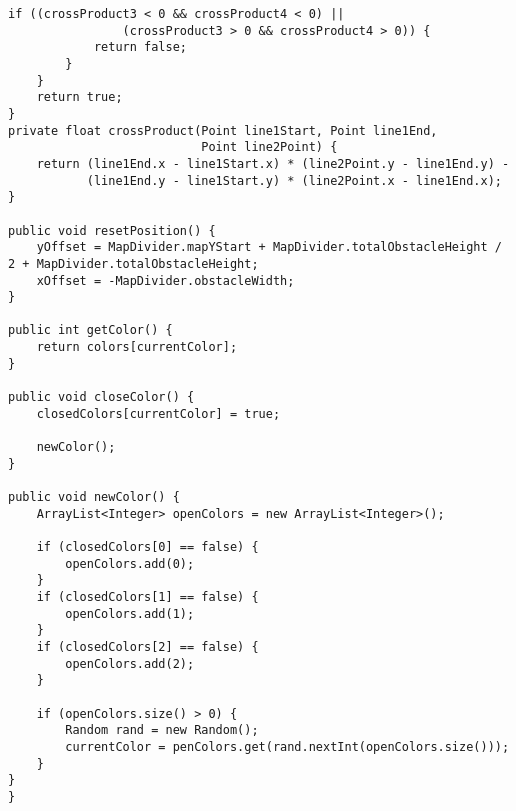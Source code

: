 \begin{lstlisting}[style=csharp,label=car_class, caption={Run method from the original Cars project.}]
		if ((crossProduct3 < 0 && crossProduct4 < 0) ||
				(crossProduct3 > 0 && crossProduct4 > 0)) {
			return false;
		}
	}		
	return true;
}
private float crossProduct(Point line1Start, Point line1End,
						   Point line2Point) {
	return (line1End.x - line1Start.x) * (line2Point.y - line1End.y) -
		   (line1End.y - line1Start.y) * (line2Point.x - line1End.x);
}
	
public void resetPosition() {
	yOffset = MapDivider.mapYStart + MapDivider.totalObstacleHeight / 2 + MapDivider.totalObstacleHeight;
	xOffset = -MapDivider.obstacleWidth;
}
	
public int getColor() {
	return colors[currentColor];
}
	
public void closeColor() {
	closedColors[currentColor] = true;
	
	newColor();
}
	
public void newColor() {
	ArrayList<Integer> openColors = new ArrayList<Integer>();
	
	if (closedColors[0] == false) {
		openColors.add(0);
	}
	if (closedColors[1] == false) {
		openColors.add(1);
	}
	if (closedColors[2] == false) {
		openColors.add(2);
	}
		
	if (openColors.size() > 0) {
		Random rand = new Random();
		currentColor = penColors.get(rand.nextInt(openColors.size()));
	}
}
}
\end{lstlisting}